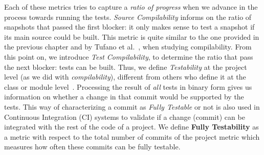 Each of these metrics tries to capture a \textit{ratio of progress} when we advance in the process towards running the tests. \textit{Source Compilability} informs on the ratio of snapshots that passed the first blocker: it only makes sense to test a snapshot if its main source could be built. This metric is quite similar to the one provided in the previous chapter and by Tufano et al.~\cite{tufano2017there}, when studying compilability. 
From this point on, we introduce \textit{Test Compilability}, to determine the ratio that pass the next blocker: tests can be built.
Thus, we define \textit{Testability} at the project level (as we did with \textit{compilability}), different from others who define it at the class or module level~\cite{bruntink2006empirical}.
Processing the result of \textit{all} tests in binary form gives us information on whether a change in that commit would be supported by the tests. 
This way of characterizing a commit as \textit{Fully Testable} or not is also used in Continuous Integration (CI) systems to validate if a change (commit) can be integrated with the rest of the code of a project.
We define \textbf{Fully Testability} as a metric with respect to the total number of commits of the project metric which measures how often these commits can be fully testable.



